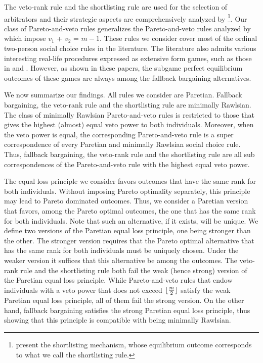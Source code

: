 \documentclass[version=3.21, pagesize, twoside=off, bibliography=totoc, DIV=calc, fontsize=12pt, a4paper]{scrartcl}
\begin{document}
The veto-rank rule and the shortlisting rule are used for the selection of arbitrators and their strategic aspects are comprehensively analyzed by \citet{Clippel}%
\footnote{ present the shortlisting mechanism, whose equilibrium outcome corresponds to what we call the shortlisting rule.}. Our class of Pareto-and-veto rules generalizes the Pareto-and-veto rules analyzed by \citet{laslier2021solution} which impose $v_1$ + $v_2$ = $m-1$. These rules we consider cover most of the ordinal two-person social choice rules in the literature. The literature also admits various interesting real-life procedures expressed as extensive form games, such as those in \citet{anbarci1993noncooperative, anbarci2006finite} and \citet{barbera2022compromising}. However, as shown in these papers, the subgame perfect equilibrium outcomes of these games are always among the fallback bargaining alternatives. 

We now summarize our findings. All rules we consider are Paretian. Fallback bargaining, the veto-rank rule and the shortlisting rule are minimally Rawlsian. The class of minimally Rawlsian Pareto-and-veto rules is restricted to those that gives the highest (almost) equal veto power to both individuals. Moreover, when the veto power is equal, the corresponding Pareto-and-veto rule is a super correspondence of every Paretian and minimally Rawlsian social choice rule. Thus, fallback bargaining, the veto-rank rule and the shortlisting rule are all sub correspondences of the Pareto-and-veto rule with the highest equal veto power.

The equal loss principle we consider favors outcomes that have the same rank for both individuals. Without imposing Pareto optimality separately, this principle may lead to Pareto dominated outcomes. Thus, we consider a Paretian version that favors, among the Pareto optimal outcomes, the one that has the same rank for both individuals. Note that such an alternative, if it exists, will be unique. We define two versions of the Paretian equal loss principle, one being stronger than the other. The stronger version requires that the Pareto optimal alternative that has the same rank for both individuals must be uniquely chosen. Under the weaker version it suffices that this alternative be among the outcomes. The veto-rank rule and the shortlisting rule both fail the weak (hence strong) version of the Paretian equal loss principle. While Pareto-and-veto rules that endow individuals with a veto power that does not exceed $\lfloor\frac{m}{2}\rfloor$ satisfy the weak Paretian equal loss principle, all of them fail the strong version. On the other hand, fallback bargaining satisfies the strong Paretian equal loss principle, thus showing that this principle is compatible with being minimally Rawlsian.
 
\end{document}
